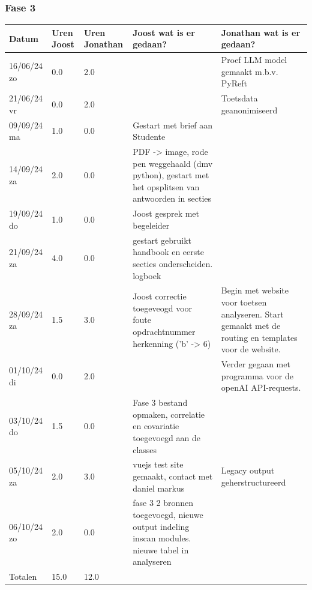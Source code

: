 \documentclass[12pt]{article}
\begin{document}
\subsubsection*{Fase 3}
\footnotesize
\begin{longtable}{@{}p{2.5cm} p{1cm} p{1.5cm} p{5cm} p{5cm}}
\toprule
Datum  & Uren Joost & Uren Jonathan & Joost wat is er gedaan? & Jonathan wat is er gedaan? \\
\hline
\midrule
\endhead
16/06/24 zo & 0.0 & 2.0 &  & Proef LLM model gemaakt m.b.v. PyReft \\
21/06/24 vr & 0.0 & 2.0 &  & Toetsdata geanonimiseerd \\
09/09/24 ma & 1.0 & 0.0 & Gestart met brief aan Studente &  \\
14/09/24 za & 2.0 & 0.0 & PDF -> image, rode pen weggehaald (dmv python), gestart met het opsplitsen van antwoorden in secties &  \\
19/09/24 do & 1.0 & 0.0 & Joost gesprek met begeleider &  \\
21/09/24 za & 4.0 & 0.0 & gestart gebruikt handbook en eerste secties onderscheiden. logboek &  \\
28/09/24 za & 1.5 & 3.0 & Joost correctie toegeveogd voor foute opdrachtnummer herkenning ('b' -> 6) & Begin met website voor toetsen analyseren. Start gemaakt met de routing en templates voor de website. \\
01/10/24 di & 0.0 & 2.0 &  & Verder gegaan met programma voor de openAI API-requests. \\
03/10/24 do & 1.5 & 0.0 & Fase 3 bestand opmaken, correlatie en covariatie toegevoegd aan de classes &  \\
05/10/24 za & 2.0 & 3.0 & vuejs test site gemaakt, contact met daniel markus & Legacy output geherstructureerd \\
06/10/24 zo & 2.0 & 0.0 & fase 3 2 bronnen toegevoegd, nieuwe output indeling inscan modules. nieuwe tabel in analyseren &  \\
\midrule
Totalen & 15.0 & 12.0 & & \\
\bottomrule
\end{longtable}
\normalsize
\pagebreak
\end{document}
